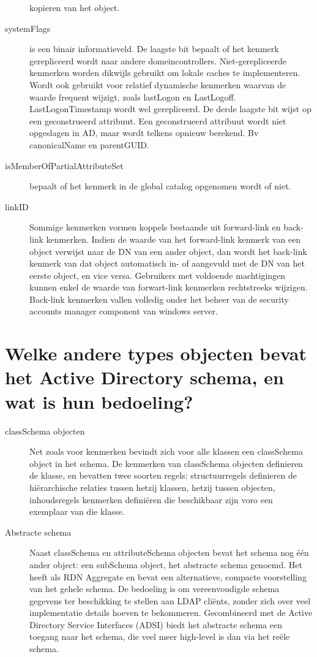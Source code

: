 \begin{description}
		kopieren van het object.
	\item[systemFlags] is een binair informatieveld. De laagste bit bepaalt
		of het kenmerk gerepliceerd wordt naar andere domeincontrollers.
		Niet-gerepliceerde kenmerken worden dikwijls gebruikt om lokale
		caches te implementeren. Wordt ook gebruikt voor relatief
		dynamische kenmerken waarvan de waarde frequent wijzigt, zoals
		lastLogon en LastLogoff. LastLogonTimestamp wordt wel
		gerepliceerd.
		De derde laagste bit wijst op een geconstrueerd attribuut. Een
		geconstrueerd attribuut wordt niet opgeslagen in AD, maar wordt
		telkens opnieuw berekend. Bv canonicalName en parentGUID.
	\item[isMemberOfPartialAttributeSet] bepaalt of het kenmerk in de global
		catalog opgenomen wordt of niet.
	\item[linkID] Sommige kenmerken vormen koppels bestaande uit
		forward-link en back-link kenmerken. Indien de waarde van het
		forward-link kenmerk van een object verwijst naar de DN van een
		ander object, dan wordt het back-link kenmerk van dat object
		automatisch in- of aangevuld met de DN van het eerste object, en
		vice versa. Gebruikers met voldoende machtigingen kunnen enkel
		de waarde van forwart-link kenmerken rechtstreeks wijzigen.
		Back-link kenmerken vallen volledig onder het beheer van de
		security accounts manager component van windows server.
\end{description}

\section{Welke andere types objecten bevat het Active Directory schema, en wat
is hun bedoeling?}

\begin{description}
	\item[classSchema objecten] Net zoals voor kenmerken bevindt zich voor
		alle klassen een classSchema object in het schema. De kenmerken
		van classSchema objecten definieren de klasse, en bevatten twee
		soorten regels: structuurregels definieren de hiërarchische
		relaties tussen hetzij klassen, hetzij tussen objecten,
		inhoudsregels kenmerken definiëren die beschikbaar zijn voro een
		exemplaar van die klasse.
	\item[Abstracte schema] Naast classSchema en attributeSchema
		objecten bevat het schema nog één ander object: een subSchema
		object, het abstracte schema genoemd. Het heeft als RDN
		Aggregate en bevat een alternatieve, compacte voorstelling van
		het gehele schema. De bedoeling is om vereenvoudigde schema
		gegevens ter beschikking te stellen aan LDAP cliënts, zonder
		zich over veel implementatie details hoeven te bekommeren.
		Gecombineerd met de Active Directory Service Interfaces (ADSI)
		biedt het abstracte schema een toegang naar het schema, die veel
		meer high-level is dan via het reële schema.
\end{description}

